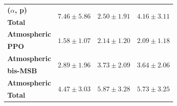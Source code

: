 \begin{table}
\begin{tabular}{lccc}
        \textbf{($\alpha$, p)} & \multirow{2}{*}{$7.46\pm5.86$} & \multirow{2}{*}{$2.50\pm1.91$} & \multirow{2}{*}{$4.16\pm3.11$} \\
        \textbf{Total} & & & \\
        \hline

        \textbf{Atmospheric} & \multirow{2}{*}{$1.58\pm1.07$} & \multirow{2}{*}{$2.14\pm1.20$} & \multirow{2}{*}{$2.09\pm1.18$} \\
        \textbf{PPO} & & & \\
        \hline

        \textbf{Atmospheric} & \multirow{2}{*}{$2.89\pm1.96$} & \multirow{2}{*}{$3.73\pm2.09$} & \multirow{2}{*}{$3.64\pm2.06$} \\
        \textbf{bis-MSB} & & & \\
        \hline

        \textbf{Atmospheric} & \multirow{2}{*}{$4.47\pm3.03$} & \multirow{2}{*}{$5.87\pm3.28$} & \multirow{2}{*}{$5.73\pm3.25$} \\
        \textbf{Total} & & & \\
        \hline

        \hline\hline
    \end{tabular}
\end{table}

